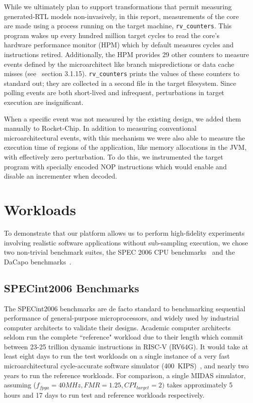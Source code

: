 While we ultimately plan to support transformations that permit
measuring generated-RTL models non-invasively, in this report,
measurements of the core are made using a process running on the target machine,
\texttt{rv\_counters}. This program wakes up every hundred million target
cycles to read the core's hardware performance monitor (HPM) which by default measures
cycles and instructions retired. Additionally, the HPM provides 29 other counters to measure
events defined by the microarchitect like branch mispredictions or data
cache misses (see~\cite{Waterman:EECS-2016-161} section 3.1.15).
\texttt{rv\_counters} prints the values of these counters to standard out; they are collected
in a second file in the target filesystem. Since polling events are both
short-lived and infrequent, perturbations in target execution are insignificant.

When a specific event was not measured by the existing design, we added them
manually to Rocket-Chip. In addition to measuring conventional
microarchitectural events, with this mechanism we were also able to measure the
execution time of regions of the application, like memory allocations in the
JVM, with effectively zero perturbation. To do this, we instrumented the target
program with specially encoded NOP instructions which would enable and disable
an incrementer when decoded.

\section{Workloads}

To demonstrate that our platform allows us to perform high-fidelity experiments
involving realistic software applications without sub-sampling execution, we
chose two non-trivial benchmark suites, the SPEC 2006 CPU
benchmarks~\cite{spec_cpu_2006} and the DaCapo benchmarks~\cite{dacapo}.

\subsection{SPECint2006 Benchmarks} The SPECint2006 benchmarks are de facto
standard to benchmarking sequential performance of general-purpose
microprocessors, and widely used by industrial computer architects to validate
their designs. Academic computer architects seldom run the complete
``reference" workload due to their length which commit between 23-25 trillion
dynamic instructions in RISC-V (RV64G).  It would take at least eight days to run
the test workloads on a single instance of a very fast microarchitectural
cycle-accurate software simulator (400~KIPS)~\cite{marssx86}, and nearly two
years to run the reference workloads. For comparison, a single MIDAS simulator,
assuming ($f_{fpga} = 40 MHz, FMR = 1.25, CPI_{target} = 2)$ takes
approximately 5 hours and 17 days to run test and reference workloads
respectively.

